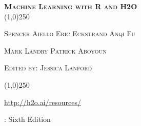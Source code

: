 %






\thispagestyle{empty} %

\begin{center}
\textsc{\Large\bf{Machine Learning with R and H2O}}
\\
\bigskip
\line(1,0){250}  %

\textsc{\small {Spencer Aiello \hspace{10pt} Eric Eckstrand \hspace{10pt} Anqi Fu}}

\textsc{\small {Mark Landry \hspace{10pt}  Patrick Aboyoun}}

\textsc{\small {Edited by: Jessica Lanford}}

\line(1,0){250}  %

{\url{http://h2o.ai/resources/}}

\bigskip
\monthname \hspace{1pt}  \the\year: Sixth Edition

\bigskip
\end{center}


\newpage
\restoregeometry

\null\vfill %
\thispagestyle{empty} %


